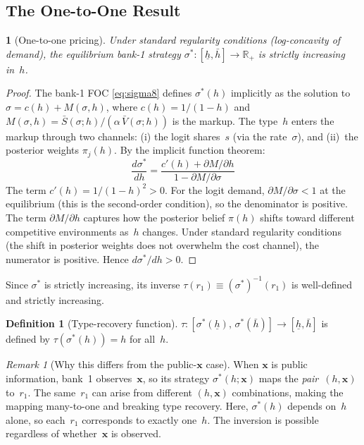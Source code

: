 \documentclass[12pt]{article}
\theoremstyle{plain}
\theoremstyle{plain}
\newtheorem{prop}[thm]{\protect\propositionname}
\theoremstyle{definition}
\newtheorem{definition}[thm]{Definition}
\theoremstyle{remark}
\newtheorem{remark}[thm]{Remark}
\providecommand{\propositionname}{Proposition}
\begin{document}
\subsection{The One-to-One Result}

\begin{prop}[One-to-one pricing]\label{prop:one_to_one}
Under standard regularity conditions (log-concavity of demand), the equilibrium bank-1 strategy $\sigma^*: [\underline{h}, \bar{h}] \to \mathbb{R}_+$ is strictly increasing in~$h$.
\end{prop}

\begin{proof}
The bank-1 FOC \eqref{eq:sigma8} defines $\sigma^*(h)$ implicitly as the solution to $\sigma = c(h) + M(\sigma, h)$, where $c(h) = 1/(1-h)$ and $M(\sigma, h) = \bar{S}(\sigma; h)/(\alpha\,\bar{V}(\sigma; h))$ is the markup.  The type~$h$ enters the markup through two channels: (i) the logit shares~$s$ (via the rate~$\sigma$), and (ii)~the posterior weights $\pi_j(h)$.  By the implicit function theorem:
\[
    \frac{d\sigma^*}{dh} = \frac{c'(h) + \partial M / \partial h}{1 - \partial M / \partial \sigma}
\]
The term $c'(h) = 1/(1-h)^2 > 0$.  For the logit demand, $\partial M/\partial \sigma < 1$ at the equilibrium (this is the second-order condition), so the denominator is positive.  The term $\partial M/\partial h$ captures how the posterior belief $\pi(h)$ shifts toward different competitive environments as~$h$ changes.  Under standard regularity conditions (the shift in posterior weights does not overwhelm the cost channel), the numerator is positive.  Hence $d\sigma^*/dh > 0$.
\end{proof}

Since $\sigma^*$ is strictly increasing, its inverse $\tau(r_1) \equiv (\sigma^*)^{-1}(r_1)$ is well-defined and strictly increasing.

\begin{definition}[Type-recovery function]\label{def:tau8}
$\tau: [\sigma^*(\underline{h}),\, \sigma^*(\bar{h})] \to [\underline{h}, \bar{h}]$ is defined by $\tau(\sigma^*(h)) = h$ for all~$h$.
\end{definition}

\begin{remark}[Why this differs from the public-$\mathbf{x}$ case]\label{rem:key_diff}
When $\mathbf{x}$ is public information, bank~1 observes~$\mathbf{x}$, so its strategy $\sigma^*(h; \mathbf{x})$ maps the \emph{pair}~$(h, \mathbf{x})$ to~$r_1$.  The same~$r_1$ can arise from different $(h, \mathbf{x})$ combinations, making the mapping many-to-one and breaking type recovery.  Here, $\sigma^*(h)$ depends on~$h$ alone, so each~$r_1$ corresponds to exactly one~$h$.  The inversion is possible regardless of whether~$\mathbf{x}$ is observed.
\end{remark}
\end{document}
